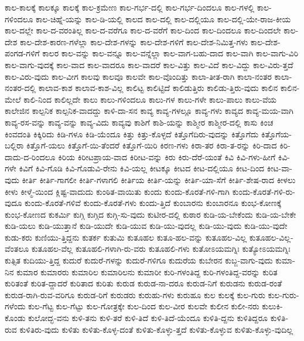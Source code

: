 {ಕಾಲ-ಕಾಲಕ್ಕೆ
ಕಾಲಕ್ಕೂ
ಕಾಲಕ್ಕೆ
ಕಾಲ-ಕ್ರಮೇಣ
ಕಾಲ-ಗರ್ಭ-ದಲ್ಲಿ
ಕಾಲ-ಗರ್ಭ-ದಿಂದಲೂ
ಕಾಲ-ಗಳಲ್ಲಿ
ಕಾಲ-ಗಳಿಂದಲೂ
ಕಾಲ-ಚಿಹ್ನೆ-ಯನ್ನು
ಕಾಲ-ಡಿ-ಯಲ್ಲಿ
ಕಾಲದ
ಕಾಲ-ದಲ್ಲಿ
ಕಾಲ-ದಲ್ಲಿಯೂ
ಕಾಲ-ದಲ್ಲಿ-ಯೇ-ರಾಜ-ಕೀಯ
ಕಾಲ-ದಲ್ಲೇ
ಕಾಲ-ದ-ವರಂತಿಲ್ಲ
ಕಾಲ-ದ-ವರೆಗೂ
ಕಾಲ-ದ-ವರೆಗೆ
ಕಾಲ-ದಿಂದ
ಕಾಲ-ದಿಂದಲೂ
ಕಾಲ-ದಿಂದಲೇ
ಕಾಲ-ದೇಶ
ಕಾಲ-ದೇಶ-ಕಾರಣ-ಗಳೆಲ್ಲಾ
ಕಾಲ-ದೇಶ-ಗಳನ್ನು
ಕಾಲ-ದೇಶ-ಗಳಿಗೆ
ಕಾಲ-ದೇಶ-ನಿಮಿತ್ತ-ಗಳು
ಕಾಲ-ದೇಶ-ಪಂಗಡ-ಗಳಿಗೆ
ಕಾಲರ
ಕಾಲ-ವನ್ನು
ಕಾಲ-ವನ್ನೂ
ಕಾಲ-ವನ್ನೆಲ್ಲಾ
ಕಾಲ-ವಾಗ-ಬಹು-ದಾದ
ಕಾಲ-ವಾಗಿ
ಕಾಲ-ವಾಗು-ವಿರಿ
ಕಾಲ-ವಾಗು-ವುದಕ್ಕೆ
ಕಾಲ-ವಾದ
ಕಾಲ-ವಾದರೂ
ಕಾಲ-ವಾದರೆ
ಕಾಲ-ವಿತ್ತು
ಕಾಲ-ವಿದೆ
ಕಾಲ-ವಿದ್ದು
ಕಾಲ-ವಿರು-ತ್ತದೆ
ಕಾಲ-ವಿರು-ವುದು
ಕಾಲ-ವೀಗ
ಕಾಲವು
ಕಾಲವೂ
ಕಾಲವೇ
ಕಾಲ-ವೊಂದಿತ್ತು
ಕಾಲಾ-ತೀತ-ರಾಗಿ
ಕಾಲಾ-ನಂತರ
ಕಾಲಾ-ನಂತರ-ದಲ್ಲಿ
ಕಾಲಾವ-ಕಾಶ
ಕಾಲಾವ-ಕಾಶ-ವಿಲ್ಲ
ಕಾಲಿಟ್ಟ
ಕಾಲಿಟ್ಟಿದೆ
ಕಾಲಿಡುತ್ತಿರು
ಕಾಲಿಡು-ತ್ತಿರು-ವುದು
ಕಾಲಿನ
ಕಾಲಿನ-ಮೇಲೆ
ಕಾಲಿ-ನಿಂದ
ಕಾಲಿಲ್ಲದೇ
ಕಾಲು
ಕಾಲು-ಗಳಿಂದಲೂ
ಕಾಲು-ಗಳ
ಕಾಲು-ಗಳೇ
ಕಾಲು-ಪಾಲು
ಕಾಲು-ವೆಯ
ಕಾಲೇಜಿನ
ಕಾಲ್ಪನಿಕ
ಕಾಲ್ಪನಿಕ-ವಾದದ್ದು
ಕಾಳಿ-ದಾ-ಸನ
ಕಾವ್ಯ
ಕಾವ್ಯ-ಗಳಲ್ಲೂ
ಕಾವ್ಯ-ಗಳು
ಕಾವ್ಯದ
ಕಾವ್ಯ-ಮಯ-ವಾಗಿ
ಕಾವ್ಯ-ರಸ-ವನ್ನು
ಕಾವ್ಯ-ವನ್ನು
ಕಾವ್ಯ-ವಿದು
ಕಾವ್ಯವು
ಕಾಶಿಗೆ
ಕಾಶಿ-ಯನ್ನು
ಕಾಶ್ಮೀರ
ಕಾಶ್ಮೀರ-ದಲ್ಲಿ
ಕಾಸು
ಕಿಂಚ
ಕಿಂವದಂತಿ
ಕಿಕ್ಕಿರಿದು
ಕಿಡಿ-ಗಳೂ
ಕಿಡಿ-ಯೆಂದೂ
ಕಿತ್ತು
ಕಿತ್ತು-ಕೊಳ್ಳದೆ
ಕಿತ್ತೊಗೆದಿರು-ವುದನ್ನು
ಕಿತ್ತೊಗೆದು
ಕಿತ್ತೊಗೆಯ-ಬಲ್ಲಿರಾ
ಕಿತ್ತೊಗೆ-ಯಲು
ಕಿತ್ತೊಗೆ-ಯಿ-ತೆಂದರೆ
ಕಿತ್ತೊಗೆ-ಯಿರಿ
ಕಿರಣ-ಗಳು
ಕಿರಾ-ತರ
ಕಿರಾ-ತ-ರನ್ನು
ಕಿರಿ-ದಾದ
ಕಿರಿ-ದಾದು-ದ-ರಿಂದಲೂ
ಕಿರಿಯ
ಕಿರೀಟಪ್ರಾಯ-ವಾದ
ಕಿರೀಟ-ವನ್ನು
ಕಿರು
ಕಿರು-ದೆರೆ-ಯಂತೆ
ಕಿವಿ
ಕಿವಿ-ಗಳು-ಹೀಗೆ
ಕಿವಿ-ಗಳೇ
ಕಿವಿಗೆ
ಕಿವಿ-ಗೊಡಿ
ಕಿವಿ-ಗೊಡುವಿ-ರೇನು
ಕಿವಿ-ಯಲ್ಲ
ಕೀಟಕ್ಕೂ
ಕೀಟದ
ಕೀಟ-ದಲ್ಲಿಯೂ
ಕೀಟ-ದಿಂದ
ಕೀಟ-ವಾ-ವುದು
ಕೀರ್ತಿ
ಕೀರ್ತಿ-ಗಾಗಲೀ
ಕೀರ್ತಿ-ಗಳಾಗಲಿ
ಕೀರ್ತಿಯ
ಕೀರ್ತಿ-ಯನ್ನು
ಕೀರ್ತಿ-ಯಾ-ಸೆಗೆ
ಕೀರ್ತಿ-ಶೇಷ-ರಾದ
ಕೀಳಲು
ಕೀಳು
ಕೀಳ್ಮೆ-ಯಿಂದ
ಕ್ಲಿಷ್ಟ-ವಾದುದು
ಕುಂಠಿತ-ವಾಯಿತು
ಕುಂದು
ಕುಂದು-ಕೊರತೆ-ಗಳಿ-ಗಾಗಿ
ಕುಂದು-ಕೊರತೆ-ಗಳಿ-ರು-ವುದೂ
ಕುಂದು-ಕೊರತೆ-ಗಳಿವೆ
ಕುಂದು-ಕೊರತೆ-ಗಳು
ಕುಂದು-ತ್ತಿದೆ
ಕುಂಬಾರನು
ಕುಂಬಾರನೂ
ಕುಂಭ-ಕೋಣಕ್ಕೆ
ಕುಂಭ-ಕೋಣದ
ಕುಕರ್ಮಿ
ಕುಗ್ಗಿ
ಕುಗ್ಗಿದ
ಕುಗ್ಗಿ-ಸು-ವುದು
ಕುಟೀರ-ದಲ್ಲಿ
ಕುಠಾರ
ಕುಡಿ-ಯ-ಬೇಕೆಂದು
ಕುಡಿ-ಯ-ಬೇಕೇ
ಕುಡಿ-ಯಲು
ಕುಡಿ-ಯುತ್ತಾನೆ
ಕುಡಿ-ಯುದೇ
ಕುಡಿ-ಯುವ
ಕುಡಿ-ಯು-ವುದಲ್ಲ
ಕುಡಿ-ಯು-ವುದು
ಕುಡಿ-ಯು-ವುದೇ
ಕುಡು-ಕರು
ಕುಣಿಯು-ತ್ತಿದ್ದನು
ಕುತರ್ಕ
ಕುತುಮಿ
ಕುತೂಹಲ
ಕುತೂ-ಹಲ-ವನ್ನು
ಕುತೂಹಲ-ವಿಲ್ಲ
ಕುತೂಹಲ-ವಿಲ್ಲ-ವೆಂತಲೂ
ಕುತೂಹಲ-ವೆಲ್ಲ
ಕುತೂಹಲಿ-ಗಳಾಗಿ-ರು-ವರು
ಕುತೂಹಲಿ-ಗಳು
ಕುತೋಽಯಮಗ್ನಿಃ
ಕುತ್ಯೋಽಯಮಗ್ನಿಃ
ಕುತ್ಸಿತ
ಕುದಿಯು-ತ್ತಿದ್ದ
ಕುದುರೆ
ಕುದುರೆ-ಗಳನ್ನು
ಕುದುರೆ-ಗಳಿಗೂ
ಕುದುರೆಯ
ಕುಬೇರನ
ಕುಬ್ಜ-ವಾಗು-ವುದು
ಕುಮಾ-ನಿನ
ಕುಮಾರ
ಕುಮಾರರು
ಕುಮಾರಿಲ
ಕುಮಾರಿಲನು
ಕುಮಾರೀ
ಕುರಿ-ಗಳಂತಿದ್ದ
ಕುರಿ-ಗಳಂತಿದ್ದ-ವರನ್ನು
ಕುರಿತ
ಕುರಿತಂತೆ
ಕುರಿತ-ದ್ದಾದರೆ
ಕುರಿತಾದ
ಕುರಿತು
ಕುರುಡ
ಕುರುಡ-ನಾ-ದರೂ
ಕುರುಡ-ನಿಗೆ
ಕುರುಡನು
ಕುರುಡ-ರಂತೆ
ಕುರುಡ-ರಾಗಿ-ರುವ-ವರಿಗೂ
ಕುರುಡ-ರಿಗೆ
ಕುರುಡರು
ಕುರುಹು-ಗಳು
ಕುರುಹೂ
ಕುಲ
ಕುಲಕ್ಕೆ
ಕುಲ-ಗುರು
ಕುಲ-ಗುರು-ಗಳೆಂದು
ಕುಲ-ಗೆಟ್ಟ
ಕುಲ-ಗೆಟ್ಟು
ಕುಲ-ಗೋತ್ರಕ್ಕೇ
ಕುಲ-ದಿಂದ
ಕುಲ-ವೀರ
ಕುಲವೇ
ಕುಲೀನ
ಕುಲೀ-ನರು
ಕುಲುಕಿ-ಕೊಂಡು
ಕುಲೋದ್ಭ-ವನು
ಕುಳಿ-ತನು
ಕುಳಿ-ತರೆ
ಕುಳಿ-ತಿದೆ
ಕುಳಿ-ತಿದೆ-ಯೆಂದೂ
ಕುಳಿತಿ-ದ್ದನು
ಕುಳಿತಿದ್ದರೂ
ಕುಳಿತಿ-ರುವ
ಕುಳಿತಿರು-ವುದು
ಕುಳಿತು
ಕುಳಿತು-ಕೊಳ್ಳ-ದಂತೆ
ಕುಳಿತು-ಕೊಳ್ಳು-ತ್ತದೆ
ಕುಳಿತು-ಕೊಳ್ಳುವ
ಕುಳಿತು-ಕೊಳ್ಳು-ವುದಿಲ್ಲ
}
